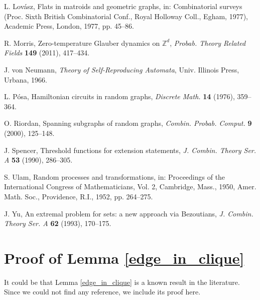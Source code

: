 \documentclass[hidelinks, 11pt]{article}
\theoremstyle{plain}
\theoremstyle{definition}
\begin{document}
\begin{thebibliography}{99}
 {\sc L.  Lov\'{a}sz}, Flats in matroids and geometric graphs, in:  Combinatorial surveys (Proc. Sixth British Combinatorial Conf., Royal Holloway Coll., Egham, 1977),  Academic Press, London, 1977, pp. 45--86.

 {\sc R. Morris}, Zero-temperature Glauber dynamics on $\mathbb{Z}^d$, {\sl Probab. Theory Related Fields}  {\bf 149} (2011), 417--434.

 {\sc J. von Neumann}, {\sl Theory of Self-Reproducing Automata}, Univ. Illinois Press, Urbana, 1966.

 {\sc L.  P\'{o}sa}, Hamiltonian circuits in random graphs, {\sl Discrete Math.}  {\bf 14} (1976), 359--364.

 {\sc O. Riordan}, Spanning subgraphs of random graphs, {\sl Combin. Probab. Comput.} {\bf 9} (2000), 125--148.

 {\sc J. Spencer}, Threshold functions for extension statements, {\sl  J. Combin. Theory Ser. A}  {\bf 53} (1990), 286--305.

 {\sc S. Ulam}, Random processes and transformations, in: Proceedings of the International Congress of Mathematicians, Vol. 2, Cambridge, Mass., 1950,  Amer. Math. Soc., Providence, R.I., 1952, pp. 264--275.

 {\sc  J.  Yu}, An extremal problem for sets: a new approach via Bezoutians,  {\sl J. Combin. Theory Ser. A}   {\bf 62} (1993), 170--175.


\end{thebibliography}



\appendix\section{Proof of Lemma \ref{edge_in_clique}}\label{appen}



It could be that  Lemma \ref{edge_in_clique}  is a known result in the  literature.  Since we  could not  find any reference, we include its proof here.
\end{document}
